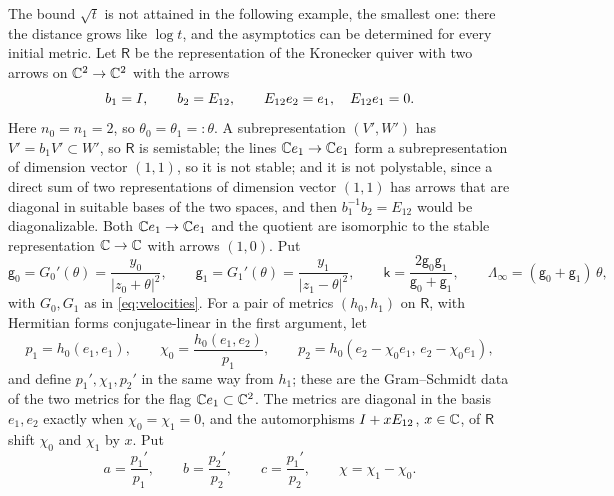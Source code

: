 The bound $\sqrt t$ is not attained in the following example, the smallest
one: there the distance grows like $\log t$, and the asymptotics can be
determined for every initial metric. Let $\mathsf R$ be the representation of
the Kronecker quiver with two arrows on $\mathbb C^2\to\mathbb C^2$ with the arrows
\[
 b_1=I,\qquad b_2=E_{12},\qquad E_{12}e_2=e_1,\quad E_{12}e_1=0 .
\]
Here $n_0=n_1=2$, so $\theta_0=\theta_1=:\theta$. A subrepresentation
$(V',W')$ has $V'=b_1V'\subset W'$, so $\mathsf R$ is semistable; the
lines $\mathbb C e_1\to\mathbb C e_1$ form a subrepresentation of dimension vector
$(1,1)$, so it is not stable; and it is not polystable, since a direct sum
of two representations of dimension vector $(1,1)$ has arrows that are
diagonal in suitable bases of the two spaces, and then $b_1^{-1}b_2=E_{12}$
would be diagonalizable. Both $\mathbb C e_1\to\mathbb C e_1$ and the quotient are
isomorphic to the stable representation $\mathbb C\to\mathbb C$ with arrows $(1,0)$. Put
\[
 \mathsf g_0=G_0'(\theta)=\frac{y_0}{|z_0+\theta|^2},\qquad
 \mathsf g_1=G_1'(\theta)=\frac{y_1}{|z_1-\theta|^2},\qquad
 \mathsf k=\frac{2\mathsf g_0\mathsf g_1}{\mathsf g_0+\mathsf g_1},\qquad
 \Lambda_\infty=(\mathsf g_0+\mathsf g_1)\,\theta,
\]
with $G_0,G_1$ as in \eqref{eq:velocities}. For a pair of metrics
$(h_0,h_1)$ on $\mathsf R$, with Hermitian forms conjugate-linear in the
first argument, let
\[
 p_1=h_0(e_1,e_1),\qquad\chi_0=\frac{h_0(e_1,e_2)}{p_1},\qquad
 p_2=h_0(e_2-\chi_0e_1,\,e_2-\chi_0e_1),
\]
and define $p_1',\chi_1,p_2'$ in the same way from $h_1$; these are the
Gram--Schmidt data of the two metrics for the flag $\mathbb C e_1\subset\mathbb C^2$.
The metrics are diagonal in the basis $e_1,e_2$ exactly when
$\chi_0=\chi_1=0$, and the automorphisms $I+xE_{12}$, $x\in\mathbb C$, of
$\mathsf R$ shift $\chi_0$ and $\chi_1$ by $x$. Put
\[
 a=\frac{p_1'}{p_1},\qquad b=\frac{p_2'}{p_2},\qquad c=\frac{p_1'}{p_2},\qquad
 \chi=\chi_1-\chi_0 .
\]

